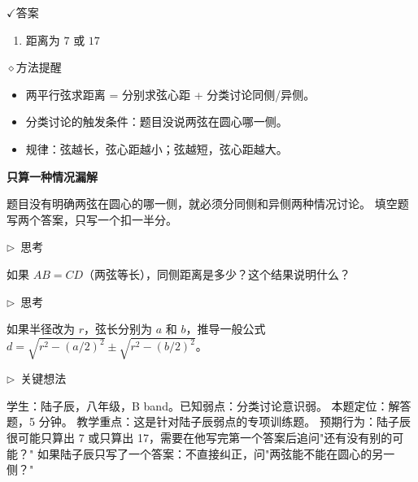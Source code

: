 \documentclass{exam-zh}
\newcommand{\edukai}{\kaishu}
\newcommand{\eduSubTitle}[1]{%
  \needspace{4\baselineskip}%
  \vspace{1mm}
  {\color{edu-blue}\bfseries #1}\par
  \vspace{1mm}
}
\newenvironment{eduAuxItem}[1]{%
  \needspace{4\baselineskip}%
  \vspace{2mm}
  \par\noindent
  \hangindent=8mm\hangafter=1
  {\color{edu-blue}\edukai $\triangleright$~#1}\enspace
  \begingroup
  \color{edu-ink}
  \edukai
}{%
  \endgroup
  \par
  \vspace{4mm}
}
\newcommand{\eduIconCheck}{\(\checkmark\)}
\newcommand{\eduIconPin}{\(\diamond\)}
\newenvironment{eduBulletList}{%
  \begin{itemize}[
    label=\textbullet,
    leftmargin=5mm,
    itemsep=1.2mm,
    topsep=0pt,
    parsep=0pt
  ]
}{%
  \end{itemize}
}
\newenvironment{eduBottomGrid}{%
  \vspace{1mm}
  \par\noindent
}{%
  \par\vspace{1mm}
}
\newenvironment{eduSummaryLeft}{%
  \begin{minipage}[t]{0.30\linewidth}
}{%
  \end{minipage}
}
\newcommand{\eduSummaryDivider}{%
  \hspace{4mm}{\color{edu-line}\vrule width 0.35pt}\hspace{7mm}%
}
\newenvironment{eduSummaryRight}{%
  \begin{minipage}[t]{0.58\linewidth}
}{%
  \end{minipage}
}
\newenvironment{eduPlainList}{%
  \begin{enumerate}[
    label=(\arabic*),
    leftmargin=7mm,
    itemsep=1.2mm,
    topsep=0pt,
    parsep=0pt
  ]
}{%
  \end{enumerate}
}
\begin{document}
\begin{eduBottomGrid}
  \begin{eduSummaryLeft}
    \begin{eduSummaryBlock}{\eduIconCheck}{答案}
    \begin{eduPlainList}
      \item 距离为 $7$ 或 $17$    \end{eduPlainList}
    \end{eduSummaryBlock}
  \end{eduSummaryLeft}
  \eduSummaryDivider
  \begin{eduSummaryRight}
    \begin{eduSummaryBlock}{\eduIconPin}{方法提醒}
    \begin{eduBulletList}
      \item 两平行弦求距离 = 分别求弦心距 + 分类讨论同侧/异侧。      \item 分类讨论的触发条件：题目没说两弦在圆心哪一侧。      \item 规律：弦越长，弦心距越小；弦越短，弦心距越大。    \end{eduBulletList}
    \end{eduSummaryBlock}
  \end{eduSummaryRight}
\end{eduBottomGrid}




\begin{eduMistakeBox}
\eduSubTitle{只算一种情况漏解}题目没有明确两弦在圆心的哪一侧，就必须分同侧和异侧两种情况讨论。
填空题写两个答案，只写一个扣一半分。
\end{eduMistakeBox}




\begin{eduAuxItem}{思考}
如果 $AB = CD$（两弦等长），同侧距离是多少？这个结果说明什么？\end{eduAuxItem}




\begin{eduAuxItem}{思考}
如果半径改为 $r$，弦长分别为 $a$ 和 $b$，推导一般公式 $d = \sqrt{r^2 - (a/2)^2} \pm \sqrt{r^2 - (b/2)^2}$。\end{eduAuxItem}



\clearpage

\begin{eduAuxItem}{关键想法}
学生：陆子辰，八年级，B band。已知弱点：分类讨论意识弱。
本题定位：解答题，5 分钟。
教学重点：这是针对陆子辰弱点的专项训练题。
预期行为：陆子辰很可能只算出 7 或只算出 17，需要在他写完第一个答案后追问"还有没有别的可能？"
如果陆子辰只写了一个答案：不直接纠正，问"两弦能不能在圆心的另一侧？"
\end{eduAuxItem}
\end{document}
